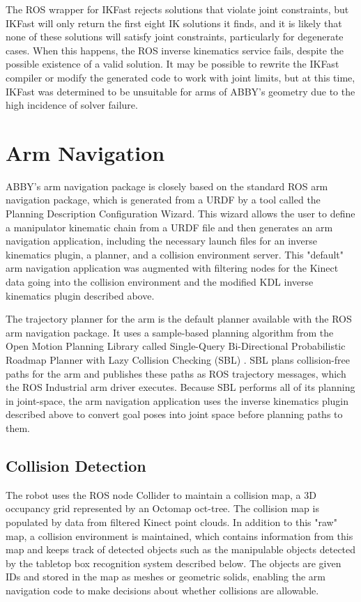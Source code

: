 \documentclass[]{cwru} %
\begin{document}
The ROS wrapper for IKFast rejects solutions that violate joint
constraints, but IKFast will only return the first eight IK solutions it
finds, and it is likely that none of these solutions will satisfy joint
constraints, particularly for degenerate cases. When this happens, the
ROS inverse kinematics service fails, despite the possible existence of
a valid solution. It may be possible to rewrite the IKFast compiler or
modify the generated code to work with joint limits, but at this time,
IKFast was determined to be unsuitable for arms of ABBY's geometry due
to the high incidence of solver failure.

\section{Arm Navigation}
\label{arm-nav}

ABBY's arm navigation package is closely based on the standard ROS arm
navigation package, which is generated from a URDF by a tool called the
Planning Description Configuration Wizard. This wizard allows the user
to define a manipulator kinematic chain from a URDF file and then
generates an arm navigation application, including the necessary launch
files for an inverse kinematics plugin, a planner, and a collision
environment server. This "default" arm navigation application was
augmented with filtering nodes for the Kinect data going into the
collision environment and the modified KDL inverse kinematics plugin
described above.

The trajectory planner for the arm is the default planner available with
the ROS arm navigation package. It uses a sample-based planning
algorithm from the Open Motion Planning Library called Single-Query
Bi-Directional Probabilistic Roadmap Planner with Lazy Collision
Checking (SBL) \cite{sanchez}. SBL plans collision-free paths for the arm and
publishes these paths as ROS trajectory messages, which the ROS
Industrial arm driver executes. Because SBL performs all of its planning
in joint-space, the arm navigation application uses the inverse
kinematics plugin described above to convert goal poses into joint space
before planning paths to them.

\subsection{Collision Detection}

The robot uses the ROS node Collider to maintain a collision map, a 3D
occupancy grid represented by an Octomap oct-tree. The collision map is
populated by data from filtered Kinect point clouds. In addition to this
"raw" map, a collision environment is maintained, which contains
information from this map and keeps track of detected objects such as
the manipulable objects detected by the tabletop box recognition system
described below. The objects are given IDs and stored in the map as
meshes or geometric solids, enabling the arm navigation code to make
decisions about whether collisions are allowable.
\end{document}

